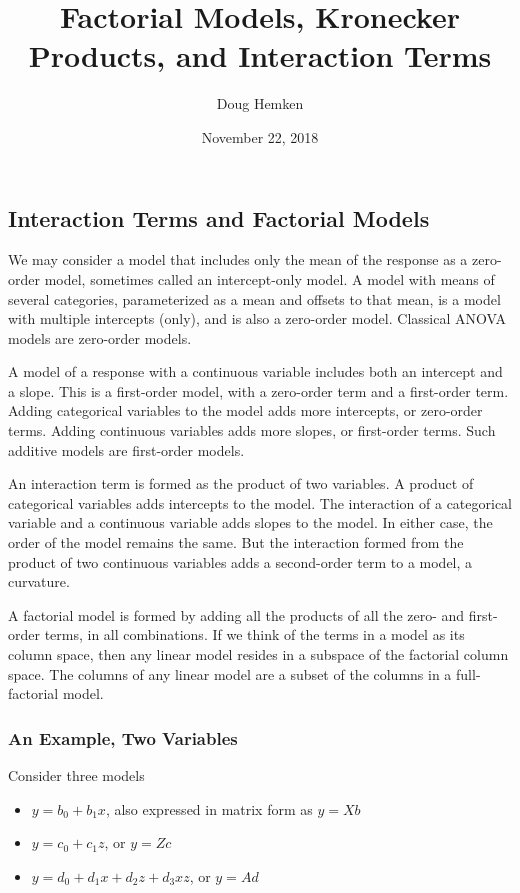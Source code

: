\documentclass[]{article}
\title{Factorial Models, Kronecker Products, and Interaction Terms}
\author{Doug Hemken}
\date{November 22, 2018}
\providecommand{\tightlist}{%
  \setlength{\itemsep}{0pt}\setlength{\parskip}{0pt}}
\begin{document}
\maketitle

\subsection{Interaction Terms and Factorial
Models}\label{interaction-terms-and-factorial-models}

We may consider a model that includes only the mean of the response as a
zero-order model, sometimes called an intercept-only model. A model with
means of several categories, parameterized as a mean and offsets to that
mean, is a model with multiple intercepts (only), and is also a
zero-order model. Classical ANOVA models are zero-order models.

A model of a response with a continuous variable includes both an
intercept and a slope. This is a first-order model, with a zero-order
term and a first-order term. Adding categorical variables to the model
adds more intercepts, or zero-order terms. Adding continuous variables
adds more slopes, or first-order terms. Such additive models are
first-order models.

An interaction term is formed as the product of two variables. A product
of categorical variables adds intercepts to the model. The interaction
of a categorical variable and a continuous variable adds slopes to the
model. In either case, the order of the model remains the same. But the
interaction formed from the product of two continuous variables adds a
second-order term to a model, a curvature.

A factorial model is formed by adding all the products of all the zero-
and first-order terms, in all combinations. If we think of the terms in
a model as its column space, then any linear model resides in a subspace
of the factorial column space. The columns of any linear model are a
subset of the columns in a full-factorial model.

\subsubsection{An Example, Two
Variables}\label{an-example-two-variables}

Consider three models

\begin{itemize}
\tightlist
\item
  \(y = b_0 + b_1x\), also expressed in matrix form as \(y = Xb\)
\item
  \(y = c_0 + c_1z\), or \(y=Zc\)
\item
  \(y = d_0 + d_1x +d_2z + d_3xz\), or \(y=Ad\)
\end{itemize}
\end{document}
